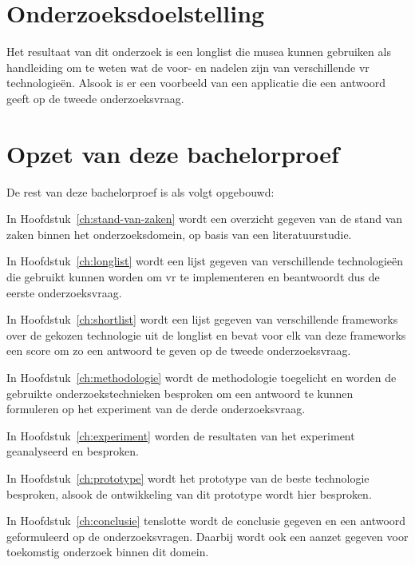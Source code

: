 \section{Onderzoeksdoelstelling}
\label{sec:onderzoeksdoelstelling}

Het resultaat van dit onderzoek is een longlist die musea kunnen gebruiken als handleiding om te weten wat de voor- en nadelen zijn van verschillende \acrshort{vr} technologieën. Alsook is er een voorbeeld van een applicatie die een antwoord geeft op de tweede onderzoeksvraag.

\section{Opzet van deze bachelorproef}
\label{sec:opzet-bachelorproef}


De rest van deze bachelorproef is als volgt opgebouwd:

In Hoofdstuk~\ref{ch:stand-van-zaken} wordt een overzicht gegeven van de stand van zaken binnen het onderzoeksdomein, op basis van een literatuurstudie.

In Hoofdstuk~\ref{ch:longlist} wordt een lijst gegeven van verschillende technologieën die gebruikt kunnen worden om \acrshort{vr} te implementeren en beantwoordt dus de eerste onderzoeksvraag.

In Hoofdstuk~\ref{ch:shortlist} wordt een lijst gegeven van verschillende frameworks over de gekozen technologie uit de longlist en bevat voor elk van deze frameworks een score om zo een antwoord te geven op de tweede onderzoeksvraag.

In Hoofdstuk~\ref{ch:methodologie} wordt de methodologie toegelicht en worden de gebruikte onderzoekstechnieken besproken om een antwoord te kunnen formuleren op het experiment van de derde onderzoeksvraag.

In Hoofdstuk~\ref{ch:experiment} worden de resultaten van het experiment geanalyseerd en besproken.

In Hoofdstuk~\ref{ch:prototype} wordt het prototype van de beste technologie besproken, alsook de ontwikkeling van dit prototype wordt hier besproken.

In Hoofdstuk~\ref{ch:conclusie} tenslotte wordt de conclusie gegeven en een antwoord geformuleerd op de onderzoeksvragen. Daarbij wordt ook een aanzet gegeven voor toekomstig onderzoek binnen dit domein.

